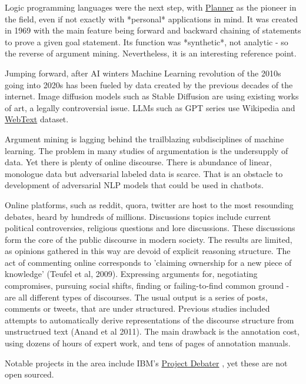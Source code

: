 \documentclass{report}
\begin{document}
Logic programming languages were the next step, with \href{https://en.wikipedia.org/wiki/Planner_(programming_language)}{Planner} as the pioneer in the field, even if not exactly with *personal* applications in mind.  It was created in 1969 with the main feature being forward and backward chaining of statements to prove a given goal statement.
Its function was *synthetic*, not analytic - so the reverse of argument mining. Nevertheless, it is an interesting reference point.

Jumping forward, after AI winters Machine Learning revolution of the 2010s going into 2020s has been fueled by data created by the previous decades of the internet. Image diffusion models such as Stable Diffusion are using existing works of art, a legally controversial issue. LLMs such as GPT series use Wikipedia and \href{https://paperswithcode.com/dataset/webtext}{WebText} dataset.

Argument mining is lagging behind the trailblazing subdisciplines of machine learning. The problem in many studies of argumentation is the undersupply of data. Yet there is plenty of online discourse.
There is abundance of linear, monologue data but adversarial labeled data is scarce. That is an obstacle to development of adversarial NLP models that could be used in chatbots. 

Online platforms, such as reddit, quora, twitter are host to the most resounding debates, heard by hundreds of millions.  Discussions topics include current political controversies, religious questions and lore discussions. These discussions form the core of the public discourse in modern society.  The results are limited, as opinions gathered in this way are devoid of explicit reasoning structure.  The act of commenting online corresponds to 'claiming ownership for a new piece of knowledge' (Teufel et al, 2009). Expressing arguments for, negotiating compromises, pursuing social shifts, finding or failing-to-find common ground - are all different types of discourses. The usual output is a series of posts, comments or tweets, that are under structured. 
Previous studies included attempts to automatically derive representations of the discourse structure from unstructrued text (Anand et al 2011).
The main drawback is the annotation cost, using dozens of hours of expert work, and tens of pages of annotation manuals.

Notable projects in the area include IBM's \href{https://research.ibm.com/interactive/project-debater/}{Project Debater} \cite{slonim2021autonomous}, yet these are not open sourced.
\end{document}
